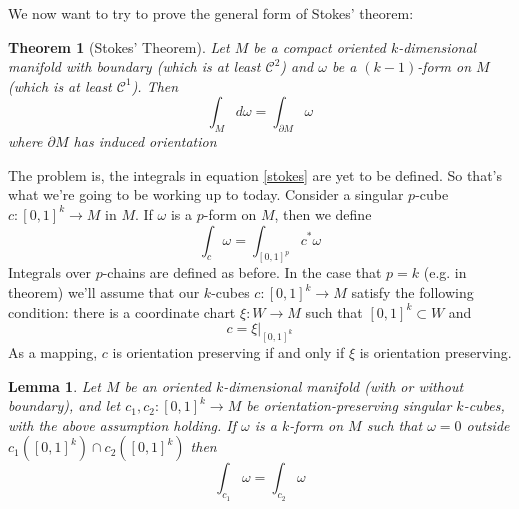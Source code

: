 \documentclass{article}
\newtheorem{theorem}{Theorem}
\newtheorem{lemma}{Lemma}
\newcommand{\mc}[1]{\mathcal{#1}}
\begin{document}
We now want to try to prove the general form of Stokes' theorem:
\begin{theorem}[Stokes' Theorem]

  Let \(M\) be a compact oriented \(k\)-dimensional manifold with boundary (which is at least
  \(\mc{C}^2\)) and \(\omega\) be a \((k - 1)\)-form on \(M\) (which is at least \(\mc{C}^1\)). Then
  \begin{equation}
    \int_Md\omega = \int_{\partial M}\omega
    \label{stokes}
  \end{equation}
  where \(\partial M\) has induced orientation
\end{theorem}
The problem is, the integrals in equation \ref{stokes} are yet to be defined. So that's what we're going to be working up to today.
Consider a singular \(p\)-cube \(c: [0, 1]^k \to M\) in \(M\). If \(\omega\) is a \(p\)-form on \(M\), then we define
\begin{equation}
  \int_c\omega = \int_{[0, 1]^p}c^*\omega
\end{equation}
Integrals over \(p\)-chains are defined as before. In the case that \(p = k\) (e.g. in theorem) we'll assume that our \(k\)-cubes \(c:[0, 1]^k \to M\) satisfy the following condition: there is a coordinate chart \(\xi: W \to M\) such that \([0, 1]^k \subset W\) and
\begin{equation}
  c = \xi|_{[0, 1]^k}
\end{equation}
As a mapping, \(c\) is orientation preserving if and only if \(\xi\) is orientation preserving.
\begin{lemma}
  Let \(M\) be an oriented \(k\)-dimensional manifold (with or without boundary), and let \(c_1, c_2: [0, 1]^k \to M\) be orientation-preserving singular \(k\)-cubes, with the above assumption holding. If \(\omega\) is a \(k\)-form on \(M\) such that \(\omega = 0\) outside \(c_1([0, 1]^k) \cap c_2([0, 1]^k)\) then
  \begin{equation}
    \int_{c_1}\omega = \int_{c_2}\omega
  \end{equation}
  \label{cind}
\end{lemma}
\end{document}
